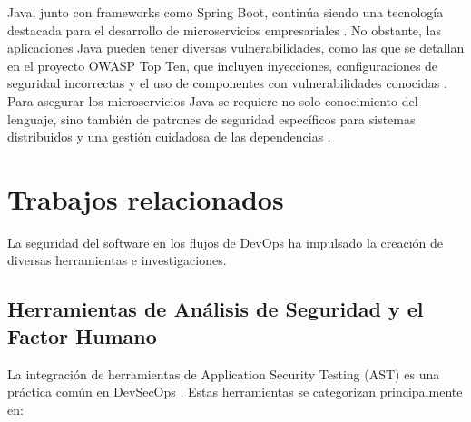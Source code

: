 Java, junto con frameworks como Spring Boot, continúa siendo una tecnología destacada para el desarrollo de microservicios empresariales \cite{FiniteState2023JavaVulnerabilities}. No obstante, las aplicaciones Java pueden tener diversas vulnerabilidades, como las que se detallan en el proyecto OWASP Top Ten, que incluyen inyecciones, configuraciones de seguridad incorrectas y el uso de componentes con vulnerabilidades conocidas \cite{OWASP2021TopTen}. Para asegurar los microservicios Java se requiere no solo conocimiento del lenguaje, sino también de patrones de seguridad específicos para sistemas distribuidos y una gestión cuidadosa de las dependencias \cite{FiniteState2023JavaVulnerabilities, OWASP2021TopTen}.

\section{Trabajos relacionados}\label{sec:trabajos_relacionados}

La seguridad del software en los flujos de DevOps ha impulsado la creación de diversas herramientas e investigaciones.

\subsection{Herramientas de Análisis de Seguridad y el Factor Humano}

La integración de herramientas de Application Security Testing (AST) es una práctica común en DevSecOps \cite{Kumar2022DevSecOpsReview}. Estas herramientas se categorizan principalmente en:


